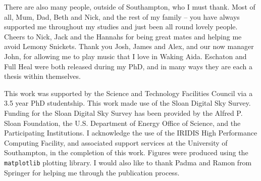 \documentclass[a4paper, 11pt, twoside]{Thesis}  %
\begin{document}
{There are also many people, outside of Southampton, who I must thank.
Most of all, Mum, Dad, Beth and Nick, and the rest of my family -- you have always
supported me throughout my studies and just been all round lovely people.
Cheers to Nick, Jack and the Hannahs for being great mates and helping me avoid 
Lemony Snickets. Thank you Josh, James and Alex, and our now manager John,
for allowing me to play music that I love in Waking Aida. 
Eschaton and Full Heal were both released during my PhD, and in many ways 
they are each a thesis within themselves. 

This work was supported by the Science and Technology Facilities Council
via a 3.5 year PhD studentship. This work made use of the Sloan Digital Sky Survey.
Funding for the Sloan Digital Sky Survey has been provided by
the Alfred P. Sloan Foundation, the U.S. Department of Energy Office of
Science, and the Participating Institutions.
I acknowledge the use of the IRIDIS High Performance Computing 
Facility, and associated support services at the University of 
Southampton, in the completion of this work. 
Figures were produced using the {\tt matplotlib} plotting library.
I would also like to thank Padma and Ramon from Springer for helping
me through the publication process.
}

\clearpage
\end{document}
